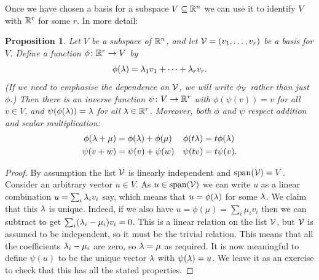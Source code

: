 \documentclass[reqno]{amsart}
\newtheorem{proposition}[theorem]{Proposition}
\theoremstyle{definition}
\begin{document}
Once we have chosen a basis for a subspace $V\subseteq{\mathbb{R}}^n$ we can use it
to identify $V$ with ${\mathbb{R}}^r$ for some $r$.  In more detail:

\begin{proposition}\label{prop-basis-iso}
 Let $V$ be a subspace of ${\mathbb{R}}^n$, and let $\mathcal{V}=(v_1,\dotsc,v_r)$ be a
 basis for $V$.  Define a function $\phi\colon{\mathbb{R}}^r\to V$ by
 \[ \phi(\lambda) = \lambda_1v_1 + \dotsb + \lambda_rv_r. \]
 (If we need to emphasise the dependence on $\mathcal{V}$, we will write
 $\phi_{\mathcal{V}}$ rather than just $\phi$.)  Then there is an inverse
 function $\psi\colon V\to{\mathbb{R}}^r$ with $\phi(\psi(v))=v$ for all $v\in V$,
 and $\psi(\phi(\lambda))=\lambda$ for all $\lambda\in{\mathbb{R}}^r$.  Moreover, both
 $\phi$ and $\psi$ respect addition and scalar multiplication:
 \begin{align*}
  \phi(\lambda+\mu) &= \phi(\lambda)+\phi(\mu) & \phi(t\lambda) &=t\phi(\lambda) \\
  \psi(v+w) &= \psi(v)+\psi(w) & \psi(tv) &= t\psi(v).
 \end{align*}
\end{proposition}
\begin{proof}
 By assumption the list $\mathcal{V}$ is linearly independent and
 $\operatorname{span}(\mathcal{V})=V$.   Consider an arbitrary vector $u\in V$.  As
 $u\in\operatorname{span}(\mathcal{V})$ we can write $u$ as a linear combination
 $u=\sum_i\lambda_iv_i$ say, which means that $u=\phi(\lambda)$ for some
 $\lambda$.  We claim that this $\lambda$ is unique.  Indeed, if we also have
 $u=\phi(\mu)=\sum_i\mu_iv_i$ then we can subtract to get
 $\sum_i(\lambda_i-\mu_i)v_i=0$.  This is a linear relation on the list
 $\mathcal{V}$, but $\mathcal{V}$ is assumed to be independent, so it must be the
 trivial relation.  This means that all the coefficients $\lambda_i-\mu_i$
 are zero, so $\lambda=\mu$ as required.  It is now meaningful to define
 $\psi(u)$ to be the unique vector $\lambda$ with $\psi(\lambda)=u$.  We leave
 it as an exercise to check that this has all the stated properties.
\end{proof}
\end{document}
